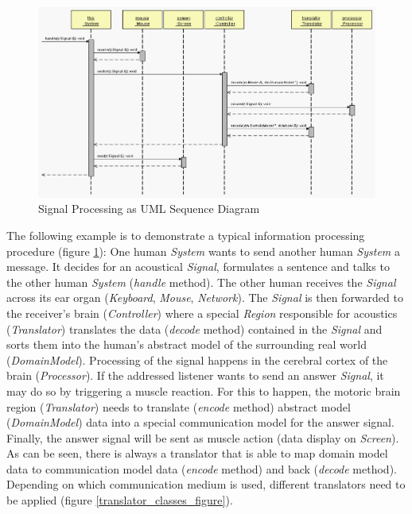 \begin{figure}[ht]
    \begin{center}
       \includegraphics[scale=0.32]{images/sequence_diagram.eps}
       \caption{Signal Processing as UML Sequence Diagram}
       \label{sequence_diagram_figure}
    \end{center}
\end{figure}

The following example is to demonstrate a typical information processing procedure
(figure \ref{sequence_diagram_figure}):
One human \emph{System} wants to send another human \emph{System} a message.
It decides for an acoustical \emph{Signal}, formulates a sentence and talks to
the other human \emph{System} (\emph{handle} method). The other human receives the
\emph{Signal} across its ear organ (\emph{Keyboard}, \emph{Mouse}, \emph{Network}).
The \emph{Signal} is then forwarded to the receiver's brain (\emph{Controller})
where a special \emph{Region} responsible for acoustics (\emph{Translator})
translates the data (\emph{decode} method) contained in the \emph{Signal} and sorts
them into the human's abstract model of the surrounding real world (\emph{DomainModel}).
Processing of the signal happens in the cerebral cortex of the brain (\emph{Processor}).
If the addressed listener wants to send an answer \emph{Signal}, it may do so by
triggering a muscle reaction. For this to happen, the motoric brain region (\emph{Translator})
needs to translate (\emph{encode} method) abstract model (\emph{DomainModel}) data
into a special communication model for the answer signal. Finally, the answer
signal will be sent as muscle action (data display on \emph{Screen}).\\
As can be seen, there is always a translator that is able to map domain model data
to communication model data (\emph{encode} method) and back (\emph{decode} method).
Depending on which communication medium is used, different translators need to be
applied (figure \ref{translator_classes_figure}).


